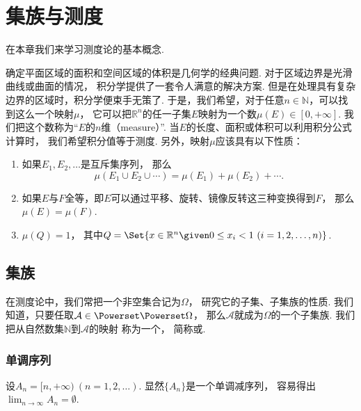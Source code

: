 \chapter{集族与测度}
在本章我们来学习测度论的基本概念.

确定平面区域的面积和空间区域的体积是几何学的经典问题.
对于区域边界是光滑曲线或曲面的情况，
积分学提供了一套令人满意的解决方案.
但是在处理具有复杂边界的区域时，积分学便束手无策了.
于是，我们希望，对于任意\(n\in\mathbb{N}\)，可以找到这么一个映射\(\mu\)，
它可以把\(\mathbb{R}^n\)的任一子集\(E\)映射为一个数\(\mu(E) \in [0,+\infty]\).
我们把这个数称为“\(E\)的\(n\)维（measure）”.
当\(E\)的长度、面积或体积可以利用积分公式计算时，
我们希望积分值等于测度.
另外，映射\(\mu\)应该具有以下性质：\begin{enumerate}
	\item 如果\(E_1,E_2,\dotsc\)是互斥集序列，
	那么\begin{equation*}
		\mu(E_1 \cup E_2 \cup \dotsb)
		= \mu(E_1) + \mu(E_2) + \dotsb.
	\end{equation*}

	\item 如果\(E\)与\(F\)全等，即\(E\)可以通过平移、旋转、镜像反转这三种变换得到\(F\)，
	那么\(\mu(E) = \mu(F)\).

	\item \(\mu(Q)=1\)，
	其中\(Q = \Set{ x\in\mathbb{R}^n \given 0\leq x_i<1\ (i=1,2,\dotsc,n) }\).
\end{enumerate}

\section{集族}
在测度论中，我们常把一个非空集合记为\(\Omega\)，
研究它的子集、子集族的性质.
我们知道，只要任取\(\mathcal{A} \in \Powerset\Powerset\Omega\)，
那么\(\mathcal{A}\)就成为\(\Omega\)的一个子集族.
我们把从自然数集\(\mathbb{N}\)到\(\mathcal{A}\)的映射
称为一个，
简称或.

\subsection{单调序列}
\begin{example}
设\(A_n = [n,+\infty)\ (n=1,2,\dotsc)\).
显然\(\{A_n\}\)是一个单调减序列，
容易得出\(\lim_{n\to\infty} A_n = \emptyset\).
\end{example}

